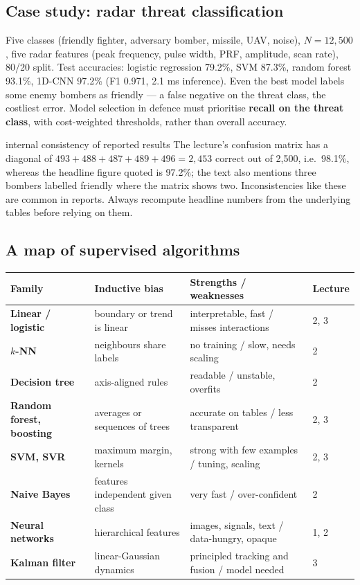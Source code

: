 \documentclass[11pt]{article}
\begin{document}
\subsection{Case study: radar threat classification}
Five classes (friendly fighter, adversary bomber, missile, UAV, noise), $N=12{,}500$, five radar features (peak frequency, pulse width, PRF, amplitude, scan rate), 80/20 split. Test accuracies: logistic regression 79.2\%, SVM 87.3\%, random forest 93.1\%, 1D-CNN 97.2\% (F1 0.971, 2.1 ms inference). Even the best model labels some enemy bombers as friendly --- a false negative on the threat class, the costliest error. Model selection in defence must prioritise \textbf{recall on the threat class}, with cost-weighted thresholds, rather than overall accuracy.
\begin{pitfall}{internal consistency of reported results}
The lecture's confusion matrix has a diagonal of $493+488+487+489+496=2{,}453$ correct out of 2,500, i.e.\ 98.1\%, whereas the headline figure quoted is 97.2\%; the text also mentions three bombers labelled friendly where the matrix shows two. Inconsistencies like these are common in reports. Always recompute headline numbers from the underlying tables before relying on them.
\end{pitfall}

\subsection{A map of supervised algorithms}
\begin{center}\small\renewcommand{\arraystretch}{1.3}
\begin{tabularx}{\textwidth}{>{\bfseries}l X X l}\toprule Family & Inductive bias & Strengths / weaknesses & Lecture\\\midrule
Linear / logistic & boundary or trend is linear & interpretable, fast / misses interactions & 2, 3\\
$k$-NN & neighbours share labels & no training / slow, needs scaling & 2\\
Decision tree & axis-aligned rules & readable / unstable, overfits & 2\\
Random forest, boosting & averages or sequences of trees & accurate on tables / less transparent & 2, 3\\
SVM, SVR & maximum margin, kernels & strong with few examples / tuning, scaling & 2, 3\\
Naive Bayes & features independent given class & very fast / over-confident & 2\\
Neural networks & hierarchical features & images, signals, text / data-hungry, opaque & 1, 2\\
Kalman filter & linear-Gaussian dynamics & principled tracking and fusion / model needed & 3\\\bottomrule
\end{tabularx}\end{center}
\end{document}
